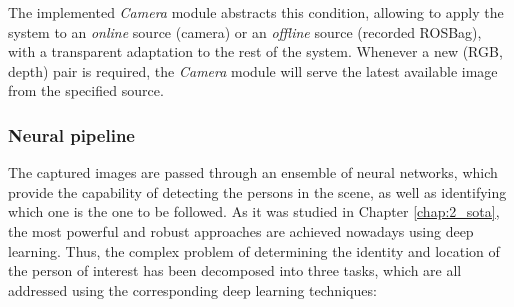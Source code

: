 The implemented \textit{Camera} module abstracts this condition, allowing to apply the system to an \textit{online} source (camera) or an \textit{offline} source (recorded ROSBag), with a transparent adaptation to the rest of the system. Whenever a new (RGB, depth) pair is required, the \textit{Camera} module will serve the latest available image from the specified source.\\


\subsubsection{Neural pipeline}

The captured images are passed through an ensemble of neural networks, which provide the capability of detecting the persons in the scene, as well as identifying which one is the one to be followed. As it was studied in Chapter \ref{chap:2_sota}, the most powerful and robust approaches are achieved nowadays using deep learning. Thus, the complex problem of determining the identity and location of the person of interest has been decomposed into three tasks, which are all addressed using the corresponding deep learning techniques:
